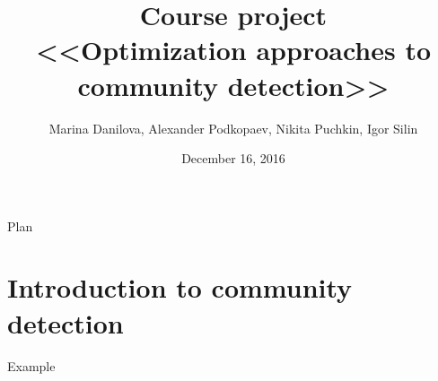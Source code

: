 \documentclass{beamer}
\theoremstyle{definition}
\theoremstyle{plain}
\theoremstyle{remark}
\begin{document}
\setlength{\abovedisplayskip}{5pt}
\setlength{\belowdisplayskip}{5pt}

	\title[\hbox to 60mm{Course project \hfill\insertframenumber\,/\,20}]
			{ Course project \\ <<Optimization approaches to community detection>>}
	\author[Igor Silin]{\large Marina Danilova, Alexander Podkopaev, Nikita Puchkin, Igor Silin}

\date{\footnotesize{December 16, 2016}}

	\begin{frame}
		\titlepage
	\end{frame}

	\begin{frame}{Plan}
		  \tableofcontents[
		    sectionstyle=show/show,
		    subsectionstyle=show/show/show
		  ]
	\end{frame}

	
	\section{Introduction to community detection}

			\begin{frame}{Example}
				\vspace{-17pt}
			\end{frame}
		
\end{document}
